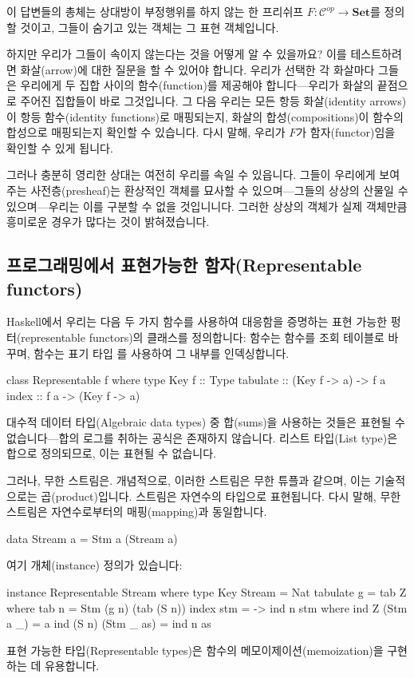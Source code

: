 \documentclass[DaoFP]{subfiles}
\begin{document}
이 답변들의 총체는 상대방이 부정행위를 하지 않는 한 프리쉬프 $F \colon \mathcal{C}^{op} \to \mathbf{Set}$를 정의할 것이고, 그들이 숨기고 있는 객체는 그 표현 객체입니다.

하지만 우리가 그들이 속이지 않는다는 것을 어떻게 알 수 있을까요? 이를 테스트하려면 화살(arrow)에 대한 질문을 할 수 있어야 합니다. 우리가 선택한 각 화살마다 그들은 우리에게 두 집합 사이의 함수(function)를 제공해야 합니다---우리가 화살의 끝점으로 주어진 집합들이 바로 그것입니다. 그 다음 우리는 모든 항등 화살(identity arrows)이 항등 함수(identity functions)로 매핑되는지, 화살의 합성(compositions)이 함수의 합성으로 매핑되는지 확인할 수 있습니다. 다시 말해, 우리가 $F$가 함자(functor)임을 확인할 수 있게 됩니다.

그러나 충분히 영리한 상대는 여전히 우리를 속일 수 있읍니다. 그들이 우리에게 보여주는 사전층(presheaf)는 환상적인 객체를 묘사할 수 있으며---그들의 상상의 산물일 수 있으며---우리는 이를 구분할 수 없을 것입니니다. 그러한 상상의 객체가 실제 객체만큼 흥미로운 경우가 많다는 것이 밝혀졌습니다.

\subsection{프로그래밍에서 표현가능한 함자(Representable functors)}

Haskell에서 우리는 다음 두 가지 함수를 사용하여 대응함을 증명하는 표현 가능한 펑터(representable functors)의 클래스를 정의합니다:  함수는 함수를 조회 테이블로 바꾸며,  함수는 표기 타입 를 사용하여 그 내부를 인덱싱합니다.

\begin{haskell}
class Representable f where
  type Key f :: Type
  tabulate :: (Key f -> a) -> f a
  index    :: f a -> (Key f -> a)
\end{haskell}

대수적 데이터 타입(Algebraic data types) 중 합(sums)을 사용하는 것들은 표현될 수 없습니다---합의 로그를 취하는 공식은 존재하지 않습니다. 리스트 타입(List type)은 합으로 정의되므로, 이는 표현될 수 없습니다.

그러나, 무한 스트림은. 개념적으로, 이러한 스트림은 무한 튜플과 같으며, 이는 기술적으로는 곱(product)입니다. 스트림은 자연수의 타입으로 표현됩니다. 다시 말해, 무한 스트림은 자연수로부터의 매핑(mapping)과 동일합니다.
\begin{haskell}
data Stream a = Stm a (Stream a)
\end{haskell}
여기 개체(instance) 정의가 있습니다:
\begin{haskell}
instance Representable Stream where
  type Key Stream = Nat
  tabulate g = tab Z
    where
      tab n = Stm (g n) (tab (S n))
  index stm = \n -> ind n stm
    where
      ind Z (Stm a _) = a
      ind (S n) (Stm _ as) = ind n as
\end{haskell}
표현 가능한 타입(Representable types)은 함수의 메모이제이션(memoization)을 구현하는 데 유용합니다.
\end{document}
